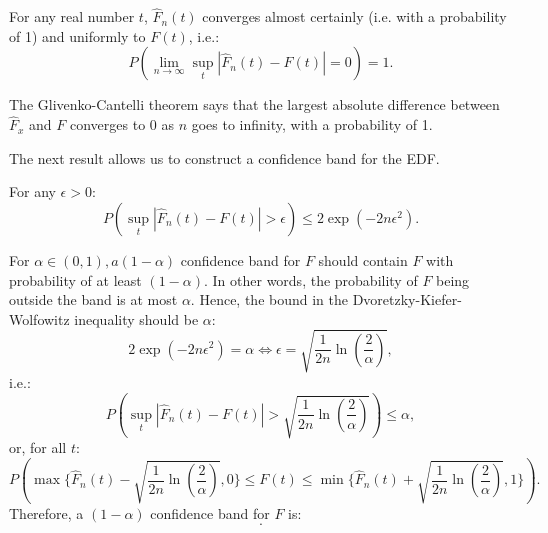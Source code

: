 \begin{prop}
For any real number $t$, $\hat{F}_n(t)$ converges almost certainly (i.e. with a probability of 1) and uniformly to $F(t)$, i.e.:
\begin{equation}
P(\lim_{n\rightarrow\infty}\sup_t|\hat{F}_n(t)-F(t)|=0)=1.
\end{equation}
\end{prop}

The Glivenko-Cantelli theorem says that the largest absolute difference between $\hat{F}_x$ and $F$ converges to 0 as $n$ goes to infinity, with a probability of 1.

The next result allows us to construct a confidence band for the EDF.

\begin{prop}
For any  $\epsilon > 0$:
\begin{equation}
P(\sup_t|\hat{F}_n(t)-F(t)|>\epsilon)\leq 2 \exp(-2n\epsilon^2).
\end{equation}
\end{prop}

For $\alpha\in (0, 1), a (1-\alpha)$ confidence band for $F$ should contain $F$ with probability of at least $(1-\alpha)$. In other words, the probability of $F$ being outside the band is at most $\alpha$. Hence, the bound in the Dvoretzky-Kiefer-Wolfowitz inequality should be $\alpha$:
\begin{equation}
2\exp(-2n\epsilon^2)=\alpha\Leftrightarrow \epsilon=\sqrt{\frac{1}{2n}\ln(\frac{2}{\alpha})},
\end{equation}
i.e.:
$$P(\sup_t|\hat{F}_n(t)-F(t)|>\sqrt{\frac{1}{2n}\ln(\frac{2}{\alpha})})\leq\alpha,$$
or, for all $t$:
$$P(\max\{\hat{F}_n(t)-\sqrt{\frac{1}{2n}\ln(\frac{2}{\alpha})},0\}\leq F(t)\leq\min\{\hat{F}_n(t)+\sqrt{\frac{1}{2n}\ln(\frac{2}{\alpha})},1\}).$$
Therefore, a $(1-\alpha )$ confidence band for $F$ is:
\begin{equation}
[\max\{\hat{F}_n(t)-\sqrt{\frac{1}{2n}\ln(\frac{2}{\alpha})},0\},\min\{ \hat{F}_n(t)+\sqrt{\frac{1}{2n}\ln(\frac{2}{\alpha})} \}].
\end{equation}

